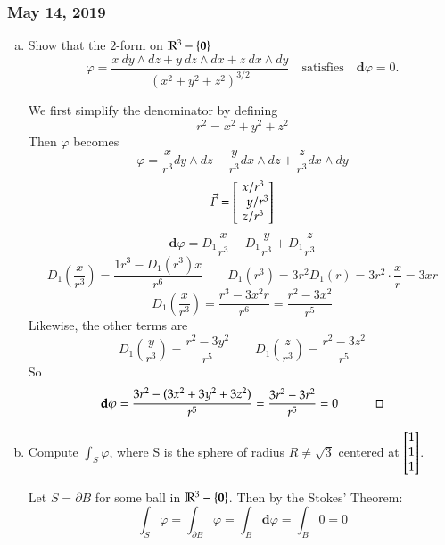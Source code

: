 \subsubsection*{May 14, 2019}

 \begin{enumerate}[a.]
	\item Show that the $2$-form on $\mathbb{R}^3 - \{\textbf{0}\}$
	\[\varphi=\frac{x\ dy\wedge dz + y\ dz\wedge dx + z\ dx\wedge dy}{(x^2+y^2+z^2)^{3/2}}\quad \text{satisfies}\quad \bm{d}\varphi=0. \]
	
	We first simplify the denominator by defining
	\[r^2=x^2+y^2+z^2\]
	Then $\varphi$ becomes
	\[\varphi = \frac{x}{r^3}dy\wedge dz - \frac{y}{r^3}dx\wedge dz + \frac{z}{r^3}dx\wedge dy\]
	\[\vec{F}=\begin{bmatrix} x/r^3 \\ -y/r^3 \\ z/r^3 \end{bmatrix}\]
	\[\bm{d}\varphi = D_1\frac{x}{r^3} - D_1\frac{y}{r^3} + D_1\frac{z}{r^3}\]
	\[D_1\left(\frac{x}{r^3}\right)=\frac{1r^3-D_1(r^3)x}{r^6}\qquad D_1(r^3)=3r^2D_1(r)=3r^2\cdot \frac{x}{r}=3xr\]
	\[D_1\left(\frac{x}{r^3}\right)= \frac{r^3-3x^2r}{r^6}=\frac{r^2-3x^2}{r^5}\]
	Likewise, the other terms are
	\[D_1\left(\frac{y}{r^3}\right)=\frac{r^2-3y^2}{r^5}\qquad D_1\left(\frac{z}{r^3}\right)=\frac{r^2-3z^2}{r^5}\]
	So
	\[\textbf{d}\varphi = \frac{3r^2-(3x^2+3y^2+3z^2)}{r^5}=\frac{3r^2-3r^2}{r^5}=0 \quad \qed\]

	\item Compute $\int_S \varphi$, where S is the sphere of radius $R \neq \sqrt{3}$ centered at $\begin{bmatrix} 1 \\ 1 \\ 1 \end{bmatrix}$. 
	
	Let $S=\partial B$ for some ball in $\mathbb{R}^3-\{\textbf{0}\}$. Then by the Stokes' Theorem: 
	\[\int_S \varphi = \int_{\partial B} \varphi = \int_{B} \bm{d}\varphi = \int_{B} 0 = 0\]
	
\end{enumerate}

